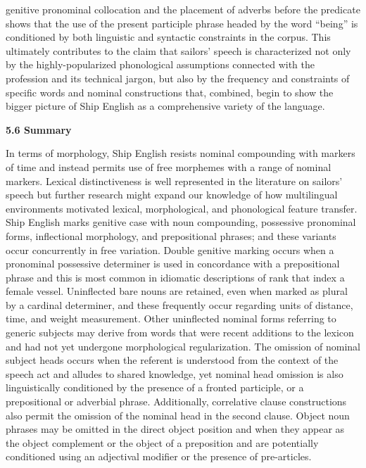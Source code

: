 \begin{styleStandard}
genitive pronominal collocation and the placement of adverbs before the predicate shows that the use of the present participle phrase headed by the word “being” is conditioned by both linguistic and syntactic constraints in the corpus. This ultimately contributes to the claim that sailors’ speech is characterized not only by the highly-popularized phonological assumptions connected with the profession and its technical jargon, but also by the frequency and constraints of specific words and nominal constructions that, combined, begin to show the bigger picture of Ship English as a comprehensive variety of the language. \ 
\end{styleStandard}


\begin{styleStandard}
\textbf{5.6 Summary }
\end{styleStandard}


\begin{styleStandard}
In terms of morphology, Ship English resists nominal compounding with markers of time and instead permits use of free morphemes with a range of nominal markers. Lexical distinctiveness is well represented in the literature on sailors’ speech but further research might expand our knowledge of how multilingual environments motivated lexical, morphological, and phonological feature transfer. Ship English marks genitive case with noun compounding, possessive pronominal forms, inflectional morphology, and prepositional phrases; and these variants occur concurrently in free variation. Double genitive marking occurs when a pronominal possessive determiner is used in concordance with a prepositional phrase and this is most common in idiomatic descriptions of rank that index a female vessel. Uninflected bare nouns are retained, even when marked as plural by a cardinal determiner, and these frequently occur regarding units of distance, time, and weight measurement. Other uninflected nominal forms referring to generic subjects may derive from words that were recent additions to the lexicon and had not yet undergone morphological regularization. The omission of nominal subject heads occurs when the referent is understood from the context of the speech act and alludes to shared knowledge, yet nominal head omission is also linguistically conditioned by the presence of a fronted participle, or a prepositional or adverbial phrase. Additionally, correlative clause constructions also permit the omission of the nominal head in the second clause. Object noun phrases may be omitted in the direct object position and when they appear as the object complement or the object of a preposition and are potentially conditioned using an adjectival modifier or the presence of pre-articles.
\end{styleStandard}


